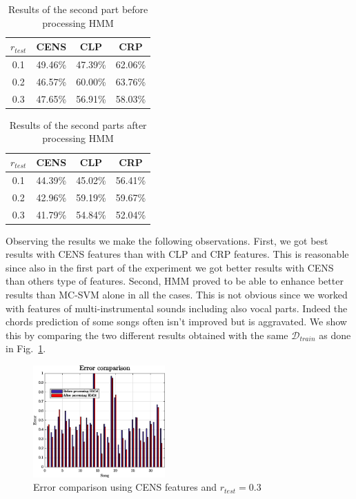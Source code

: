\begin{table}[h!]
	\caption{Results of the second part before processing HMM}
	\centering
	\begin{tabular}{|c |c c c|}
	\hline
	$r_{test}$ & CENS & CLP & CRP\\ \hline
	0.1 & 49.46\% & 47.39\% & 62.06\%\\
	0.2 & 46.57\% & 60.00\% & 63.76\%\\
	0.3 & 47.65\% & 56.91\% & 58.03\%\\
	\hline
	\end{tabular}
	\label{tab:resultbeforeHMM}
\end{table}

\begin{table}[h!]
	\caption{Results of the second parts after processing HMM}
	\centering
	\begin{tabular}{|c |c c c|}
	\hline
	$r_{test}$ & CENS & CLP & CRP\\ \hline
	0.1 & 44.39\% & 45.02\% & 56.41\%\\
	0.2 & 42.96\% & 59.19\% & 59.67\%\\
	0.3 & 41.79\% & 54.84\% & 52.04\%\\
	\hline
	\end{tabular}
	\label{tab:resultafterHMM}
\end{table}

 Observing the results we make the following observations. First, we got best results with CENS features than with CLP and CRP features. This is reasonable since also in the first part of the experiment we got better results with CENS than others type of features. Second, HMM proved to be able to enhance better results than MC-SVM alone in all the cases. This is not obvious since we worked with features of multi-instrumental sounds including also vocal parts. Indeed the chords prediction of some songs often isn't improved but is aggravated. We show this by comparing the two different results obtained with the same $\mathcal{D}_{train}$ as done in Fig.~\ref{fig:compareerror}.

\begin{figure} [h!]
	\centering
	\includegraphics[width=0.45\textwidth]{img/Result_HMM/CENS/plot03071}
	\caption{Error comparison using CENS features and $r_{test}=0.3$}
	\label{fig:compareerror}
\end{figure}

